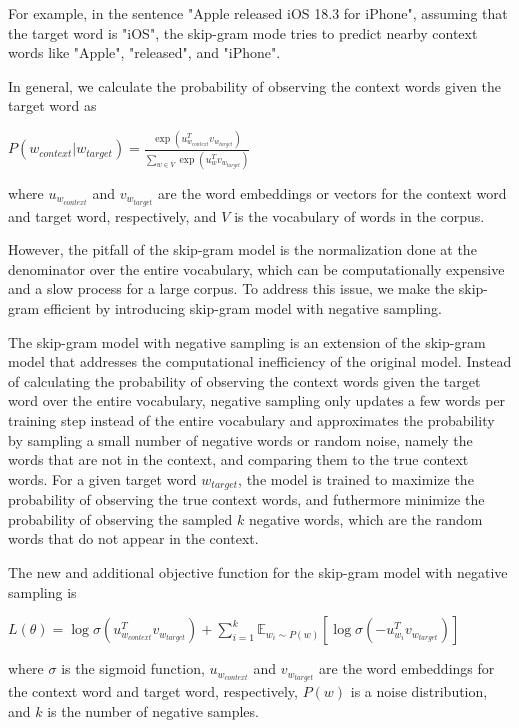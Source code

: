 \documentclass[12pt]{article}
\begin{document}
\begin{description}
  For example, in the sentence "Apple released iOS 18.3 for iPhone", assuming that the target word is "iOS", the skip-gram mode tries to predict nearby context words like 
  "Apple", "released", and "iPhone".

  In general, we calculate the probability of observing the context words given the target word as

  \begin{center}
    $\displaystyle{P(w_{context} | w_{target}) = \frac{\exp({u_{w_{context}}^T v_{w_{target}}})}{\sum_{w \in V} \exp({u_{w}^T v_{w_{target}}})}}$
  \end{center}

  where $u_{w_{context}}$ and $v_{w_{target}}$ are the word embeddings or vectors for the context word and target word, respectively, and $V$ is the vocabulary of words in the corpus.

  However, the pitfall of the skip-gram model is the normalization done at the denominator over the entire vocabulary, which can be computationally expensive and a slow process 
  for a large corpus. To address this issue, we make the skip-gram efficient by introducing skip-gram model with negative sampling.

  The skip-gram model with negative sampling is an extension of the skip-gram model that addresses the computational inefficiency of the original model. Instead of calculating
  the probability of observing the context words given the target word over the entire vocabulary, negative sampling only updates a few words per training step instead of the 
  entire vocabulary and approximates the probability by sampling a small number of negative words or random noise, namely the words that are not in the context, and comparing 
  them to the true context words. For a given target word $w_{target}$, the model is trained to maximize the probability of observing the true context words, and futhermore 
  minimize the probability of observing the sampled $k$ negative words, which are the random words that do not appear in the context.

  The new and additional objective function for the skip-gram model with negative sampling is

  \begin{center}
    $\displaystyle{L(\theta) = \log \sigma(u_{w_{context}}^T v_{w_{target}}) + \sum_{i=1}^{k}{\mathbb{E}_{w_i \sim P(w)} [\log \sigma(-u_{w_{i}}^T v_{w_{target}})]}}$
  \end{center}

  where $\sigma$ is the sigmoid function, $u_{w_{context}}$ and $v_{w_{target}}$ are the word embeddings for the context word and target word, respectively, $P(w)$ is a noise 
  distribution, and $k$ is the number of negative samples.


\end{description}
\end{document}

